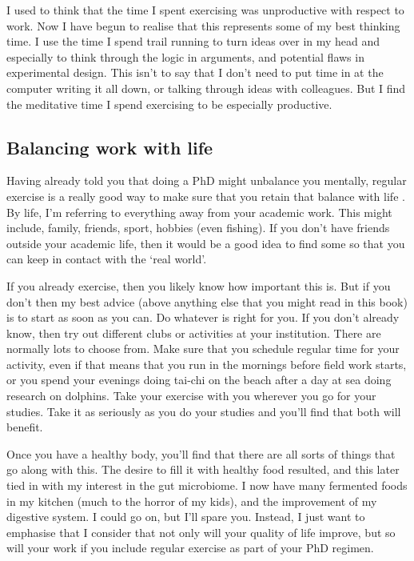 \documentclass[
]{krantz}
\begin{document}
I used to think that the time I spent exercising was unproductive with respect to work. Now I have begun to realise that this represents some of my best thinking time. I use the time I spend trail running to turn ideas over in my head and especially to think through the logic in arguments, and potential flaws in experimental design. This isn't to say that I don't need to put time in at the computer writing it all down, or talking through ideas with colleagues. But I find the meditative time I spend exercising to be especially productive.

\hypertarget{balancing-work-with-life}{%
\subsection{Balancing work with life}\label{balancing-work-with-life}}

Having already told you that doing a PhD might unbalance you mentally, regular exercise is a really good way to make sure that you retain that balance with life \citep[see][]{hotaling2018publishing}. By life, I'm referring to everything away from your academic work. This might include, family, friends, sport, hobbies (even fishing). If you don't have friends outside your academic life, then it would be a good idea to find some so that you can keep in contact with the `real world'.

If you already exercise, then you likely know how important this is. But if you don't then my best advice (above anything else that you might read in this book) is to start as soon as you can. Do whatever is right for you. If you don't already know, then try out different clubs or activities at your institution. There are normally lots to choose from. Make sure that you schedule regular time for your activity, even if that means that you run in the mornings before field work starts, or you spend your evenings doing tai-chi on the beach after a day at sea doing research on dolphins. Take your exercise with you wherever you go for your studies. Take it as seriously as you do your studies and you'll find that both will benefit.

Once you have a healthy body, you'll find that there are all sorts of things that go along with this. The desire to fill it with healthy food resulted, and this later tied in with my interest in the gut microbiome. I now have many fermented foods in my kitchen (much to the horror of my kids), and the improvement of my digestive system. I could go on, but I'll spare you. Instead, I just want to emphasise that I consider that not only will your quality of life improve, but so will your work if you include regular exercise as part of your PhD regimen.
\end{document}
